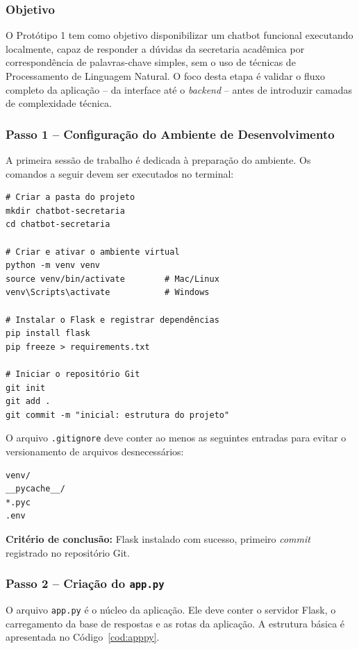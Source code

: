 \subsubsection{Objetivo}

O Protótipo 1 tem como objetivo disponibilizar um chatbot funcional executando localmente, capaz de responder a dúvidas da secretaria acadêmica por correspondência de palavras-chave simples, sem o uso de técnicas de Processamento de Linguagem Natural. O foco desta etapa é validar o fluxo completo da aplicação -- da interface até o \textit{backend} -- antes de introduzir camadas de complexidade técnica.

\subsubsection{Passo 1 -- Configuração do Ambiente de Desenvolvimento}

A primeira sessão de trabalho é dedicada à preparação do ambiente. Os comandos a seguir devem ser executados no terminal:

\begin{verbatim}
# Criar a pasta do projeto
mkdir chatbot-secretaria
cd chatbot-secretaria

# Criar e ativar o ambiente virtual
python -m venv venv
source venv/bin/activate        # Mac/Linux
venv\Scripts\activate           # Windows

# Instalar o Flask e registrar dependências
pip install flask
pip freeze > requirements.txt

# Iniciar o repositório Git
git init
git add .
git commit -m "inicial: estrutura do projeto"
\end{verbatim}

O arquivo \texttt{.gitignore} deve conter ao menos as seguintes entradas para evitar o versionamento de arquivos desnecessários:

\begin{verbatim}
venv/
__pycache__/
*.pyc
.env
\end{verbatim}

\textbf{Critério de conclusão:} Flask instalado com sucesso, primeiro \textit{commit} registrado no repositório Git.

\subsubsection{Passo 2 -- Criação do \texttt{app.py}}

O arquivo \texttt{app.py} é o núcleo da aplicação. Ele deve conter o servidor Flask, o carregamento da base de respostas e as rotas da aplicação. A estrutura básica é apresentada no Código~\ref{cod:apppy}.

